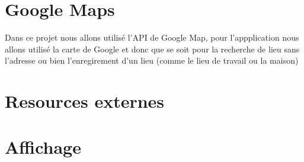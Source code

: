\section{Google Maps}
Dans ce projet nous allons utilisé l'API de Google Map, pour l'appplication nous allons utilisé la carte de Google et donc que se soit pour la recherche de lieu sans l'adresse ou bien l'enregirement d'un lieu (comme le lieu de travail ou la maison)

\section{Resources externes}

\section{Affichage}
